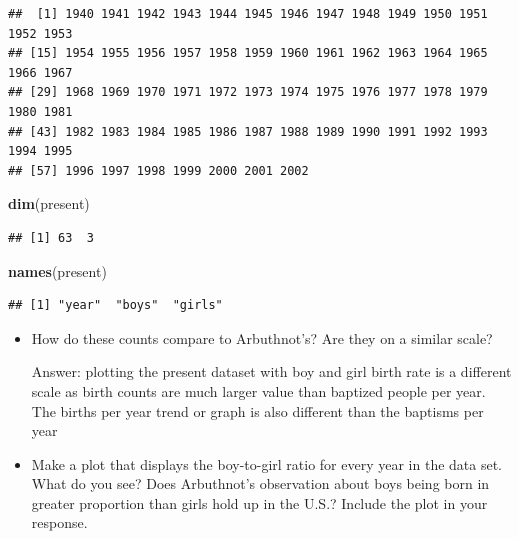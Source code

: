 \documentclass[]{article}
\newenvironment{Shaded}{\begin{snugshade}}{\end{snugshade}}
\newcommand{\KeywordTok}[1]{\textcolor[rgb]{0.13,0.29,0.53}{\textbf{#1}}}
\newcommand{\OperatorTok}[1]{\textcolor[rgb]{0.81,0.36,0.00}{\textbf{#1}}}
\newcommand{\NormalTok}[1]{#1}
\begin{document}
\begin{Shaded}
\end{Shaded}

\begin{verbatim}
##  [1] 1940 1941 1942 1943 1944 1945 1946 1947 1948 1949 1950 1951 1952 1953
## [15] 1954 1955 1956 1957 1958 1959 1960 1961 1962 1963 1964 1965 1966 1967
## [29] 1968 1969 1970 1971 1972 1973 1974 1975 1976 1977 1978 1979 1980 1981
## [43] 1982 1983 1984 1985 1986 1987 1988 1989 1990 1991 1992 1993 1994 1995
## [57] 1996 1997 1998 1999 2000 2001 2002
\end{verbatim}

\begin{Shaded}
\begin{Highlighting}[]
\KeywordTok{dim}\NormalTok{(present)}
\end{Highlighting}
\end{Shaded}

\begin{verbatim}
## [1] 63  3
\end{verbatim}

\begin{Shaded}
\begin{Highlighting}[]
\KeywordTok{names}\NormalTok{(present)}
\end{Highlighting}
\end{Shaded}

\begin{verbatim}
## [1] "year"  "boys"  "girls"
\end{verbatim}

\begin{itemize}
\item
  How do these counts compare to Arbuthnot's? Are they on a similar
  scale?

  Answer: plotting the present dataset with boy and girl birth rate is a
  different scale as birth counts are much larger value than baptized
  people per year. The births per year trend or graph is also different
  than the baptisms per year
\item
  Make a plot that displays the boy-to-girl ratio for every year in the
  data set. What do you see? Does Arbuthnot's observation about boys
  being born in greater proportion than girls hold up in the U.S.?
  Include the plot in your response.
\end{itemize}
\end{document}
